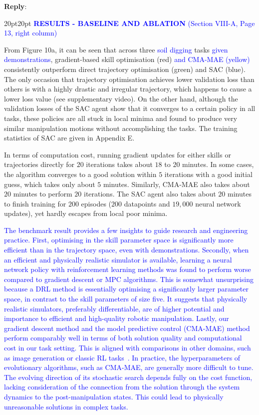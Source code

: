 \documentclass[11pt]{article}
\newcounter{reviewer}
\newcounter{point}[reviewer]
\newenvironment{reply}
   {\medskip \noindent \begin{sf}\textbf{Reply}: \  }
   {\medskip \end{sf}}
\newcommand{\xt}[1]{\textcolor{blue}{#1}}
\begin{document}
\begin{reply}
\begin{adjustwidth}{20pt}{20pt}
\vspace{0.3cm}\noindent\xt{\textbf{RESULTS - BASELINE AND ABLATION} (Section VIII-A, Page 13, right column)}

From Figure 10a, it can be seen that across three \xt{soil digging} tasks \xt{given demonstrations}, gradient-based skill optimisation (red) \xt{and CMA-MAE (yellow)} consistently outperform direct trajectory optimisation (green) and SAC (blue). The only occasion that trajectory optimisation achieves lower validation loss than others is with a highly drastic and irregular trajectory, which happens to cause a lower loss value (see supplementary video). On the other hand, although the validation losses of the SAC agent show that it converges to a certain policy in all tasks, these policies are all stuck in local minima and found to produce very similar manipulation motions without accomplishing the tasks. The training statistics of SAC are given in Appendix E.

In terms of computation cost, running gradient updates for either skills or trajectories directly for $20$ iterations takes about $18$ to $20$ minutes. In some cases, the algorithm converges to a good solution within $5$ iterations with a good initial guess, which takes only about $5$ minutes. Similarly, CMA-MAE also takes about $20$ minutes to perform $20$ iterations. The SAC agent also takes about $20$ minutes to finish training for $200$ episodes ($200$ datapoints and $19,000$ neural network updates), yet hardly escapes from local poor minima. 

\xt{The benchmark result provides a few insights to guide research and engineering practice. First, optimising in the skill parameter space is significantly more efficient than in the trajectory space, even with demonstrations. Secondly, when an efficient and physically realistic simulator is available, learning a neural network policy with reinforcement learning methods was found to perform worse compared to gradient descent or MPC algorithms. This is somewhat unsurprising because a DRL method is essentially optimising a significantly larger parameter space, in contrast to the skill parameters of size five. It suggests that physically realistic simulators, preferably differentiable, are of higher potential and importance to efficient and high-quality robotic manipulation. Lastly, our gradient descent method and the model predictive control (CMA-MAE) method perform comparably well in terms of both solution quality and computational cost in our task setting. This is aligned with comparisons in other domains, such as image generation or classic RL tasks~\cite{zhao2025cmamae-exp}. In practice, the hyperparameters of evolutionary algorithms, such as CMA-MAE, are generally more difficult to tune. The evolving direction of its stochastic search depends fully on the cost function, lacking consideration of the connection from the solution through the system dynamics to the post-manipulation states. This could lead to physically unreasonable solutions in complex tasks.}


\end{adjustwidth}
\end{reply}
\end{document}
